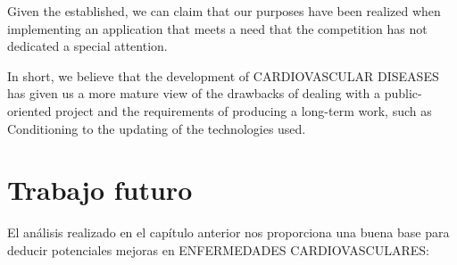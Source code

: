 \documentclass[11pt,spanish,
		listoftables,listoffigures]
		{tfgplantilla}
\begin{document}
Given the established, we can claim that our purposes have been realized when implementing an application that meets a need that the competition has not dedicated a special attention.

In short, we believe that the development of \MakeUppercase {Cardiovascular Diseases} has given us a more mature view of the drawbacks of dealing with a public-oriented project and the requirements of producing a long-term work, such as Conditioning to the updating of the technologies used.

\chapter{Trabajo futuro}

El análisis realizado en el capítulo anterior nos proporciona una buena base para deducir potenciales mejoras en \MakeUppercase{Enfermedades Cardiovasculares}:
\end{document}
